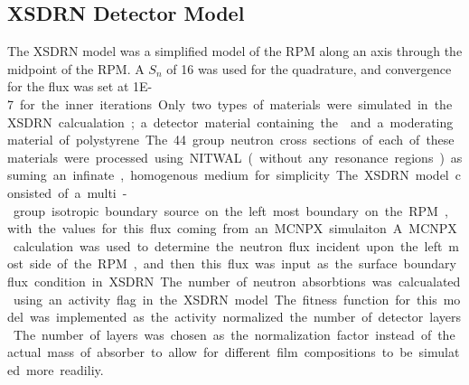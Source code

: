 \subsection{XSDRN Detector Model}
The XSDRN model was a simplified model of the RPM along an axis through the midpoint of the RPM.
A $S_n$ of 16 was used for the quadrature, and convergence for the flux was set at \SI{1E-7} for the inner iterations.
Only two types of materials were simulated in the XSDRN calcualation; a detector material containing the  and a moderating material of polystyrene.
The 44 group neutron cross sections of each of these materials were processed using NITWAL (without any resonance regions) assuming an infinate, homogenous medium for simplicity.
The XSDRN model consisted of a multi-group isotropic boundary source on the left most boundary on the RPM, with the values for this flux coming from an MCNPX simulaiton.
A MCNPX calculation was used to determine the neutron flux incident upon the left most side of the RPM, and then this flux was input as the surface boundary flux condition in XSDRN.
The number of neutron absorbtions was calcualated using an activity flag in the XSDRN model.
The fitness function for this model was implemented as the activity normalized the number of detector layers.
The number of layers was chosen as the normalization factor instead of the actual mass of absorber to allow for different film compositions to be simulated more readiliy.
